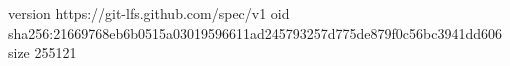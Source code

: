 version https://git-lfs.github.com/spec/v1
oid sha256:21669768eb6b0515a03019596611ad245793257d775de879f0c56bc3941dd606
size 255121
